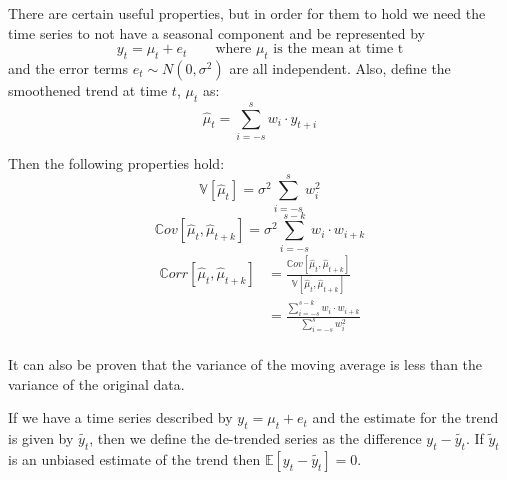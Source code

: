 \documentclass[12pt]{article}
\begin{document}
        There are certain useful properties, but in order for them to hold we need
        the time series to not have a seasonal component and be represented by
        \begin{equation*}
            y_t = \mu_t + e_t \qquad \text{where $\mu_t$ is the mean at time t}
        \end{equation*}
        and the error terms $e_t \sim N(0, \sigma^2)$ are all independent.
        Also, define the smoothened trend at time $t$, $\mu_t$ as:
        \begin{equation*}
            \hat{\mu}_t = \sum_{i = -s}^s w_i \cdot y_{t + i}
        \end{equation*}

        Then the following properties hold:
        \begin{equation*}
            \mathbb{V}[\hat{\mu}_t] = \sigma^2 \sum_{i = -s}^{s} w^2_i
        \end{equation*}
        \begin{equation*}
            \mathbb{C}ov[\hat{\mu}_t, \hat{\mu}_{t+k}] = 
            \sigma^2 \sum_{i = -s}^{s-k} w_i \cdot w_{i+k}
        \end{equation*}
        \begin{equation*}
            \begin{aligned}
                \mathbb{C}orr[\hat{\mu}_t, \hat{\mu}_{t+k}] &= 
                \frac{\mathbb{C}ov[\hat{\mu}_t, \hat{\mu}_{t+k}]}{
                \mathbb{V}[\hat{\mu}_t, \hat{\mu}_{t+k}]} \\
                                                            &= \frac{
                                                                \sum_{i = -s}^{s-k} w_i \cdot w_{i+k}
                                                                }{ 
                                                                \sum_{i = -s}^{s} w^2_i
                                                            }\\
                                                        \end{aligned}
    \end{equation*}

    It can also be proven that the variance of the moving average is less than the 
    variance of the original data.

    If we have a time series described by $y_t = \mu_t + e_t$ and the estimate
    for the trend is given by $\tilde{y_t}$, then we define the de-trended series
    as the difference $y_t - \tilde{y_t}$. If $\tilde{y}_t$ is an unbiased estimate
    of the trend then $\mathbb{E}[y_t - \tilde{y_t}] = 0$.
\end{document}
